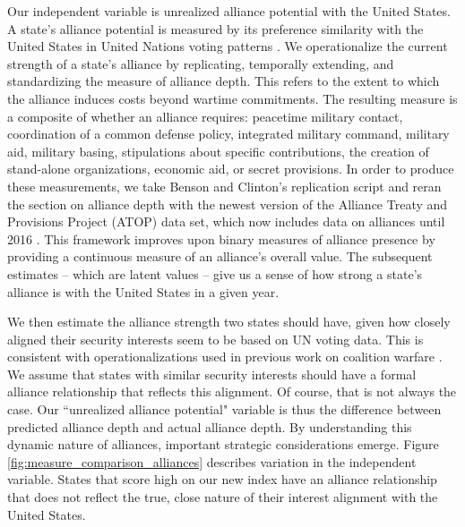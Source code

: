 \documentclass[12pt,letterpaper]{article}
\begin{document}
		Our independent variable is unrealized alliance potential with the United States. A state's alliance potential is measured by its preference similarity with the United States in United Nations voting patterns \citep{gartzke_preferencesdemocraticpeace_2000}. We operationalize the current strength of a state's alliance by replicating, temporally extending, and standardizing the \citet{benson_assessingvariationformal_2016} measure of alliance depth. This refers to the extent to which the alliance induces costs beyond wartime commitments. The resulting measure is a composite of whether an alliance requires: peacetime military contact, coordination of a common defense policy, integrated military command, military aid, military basing, stipulations about specific contributions, the creation of stand-alone organizations, economic aid, or secret provisions. In order to produce these measurements, we take Benson and Clinton's replication script and reran the section on alliance depth with the newest version of the Alliance Treaty and Provisions Project (ATOP) data set, which now includes data on alliances until 2016 \citep{leeds_alliancetreatyobligations_2002}. This framework improves upon binary measures of alliance presence by providing a continuous measure of an alliance's overall value. The subsequent estimates -- which are latent values -- give us a sense of how strong a state's alliance is with the United States in a given year.

		We then estimate the alliance strength two states should have, given how closely aligned their security interests seem to be based on UN voting data. This is consistent with operationalizations used in previous work on coalition warfare \citep{wolford_politicsmilitarycoalitions_2015}. We assume that states with similar security interests should have a formal alliance relationship that reflects this alignment. Of course, that is not always the case. Our ``unrealized alliance potential" variable is thus the difference between predicted alliance depth and actual alliance depth. By understanding this dynamic nature of alliances, important strategic considerations emerge. Figure \ref{fig:measure_comparison_alliances} describes variation in the independent variable. States that score high on our new index have an alliance relationship that does not reflect the true, close nature of their interest alignment with the United States.
\end{document}
